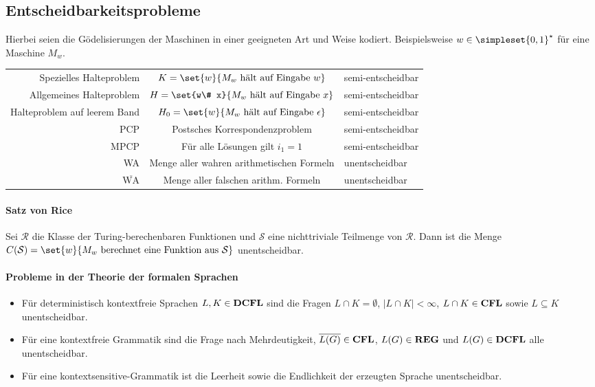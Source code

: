 \subsection{Entscheidbarkeitsprobleme}
Hierbei seien die Gödelisierungen der Maschinen in einer geeigneten Art und Weise kodiert. Beispielsweise $w\in\simpleset{0,1}^\star$ für eine Maschine $M_w$.
\medskip

\begin{tabular}{r|c|l}
	Spezielles Halteproblem & $K=\set{w}{M_w \text{ hält auf Eingabe } w}$ & semi-entscheidbar\\
	Allgemeines Halteproblem & $H=\set{w\# x}{M_w \text{ hält auf Eingabe } x}$ & semi-entscheidbar\\
	Halteproblem auf leerem Band & $H_0=\set{w}{M_w \text{ hält auf Eingabe } \epsilon}$ & semi-entscheidbar\\
	PCP & Postsches Korrespondenzproblem & semi-entscheidbar\\
	MPCP & Für alle Lösungen gilt $i_1=1$ & semi-entscheidbar\\
	WA & Menge aller wahren arithmetischen Formeln & unentscheidbar\\
	$\overline{\text{WA}}$ & Menge aller falschen arithm. Formeln & unentscheidbar
\end{tabular}

\paragraph{Satz von Rice}
Sei $\mathcal R$ die Klasse der Turing-berechenbaren Funktionen und $\mathcal S$ eine nichttriviale Teilmenge von $\mathcal R$.
Dann ist die Menge $C(\mathcal S)=\set{w}{M_w \text{ berechnet eine Funktion aus } \mathcal S}$ unentscheidbar.

\paragraph{Probleme in der Theorie der formalen Sprachen}
\begin{itemize}
	\item Für deterministisch kontextfreie Sprachen $L,K\in\operatorname{\mathbf{DCFL}}$ sind die Fragen $L\cap K=\emptyset$, $|L\cap K|<\infty$, $L\cap K \in \operatorname{\mathbf{CFL}}$ sowie $L\subseteq K$ unentscheidbar.
	\item Für eine kontextfreie Grammatik sind die Frage nach Mehrdeutigkeit, $\overline{L(G)}\in\operatorname{\mathbf{CFL}}$, $L(G)\in \operatorname{\mathbf{REG}}$ und $L(G)\in \operatorname{\mathbf{DCFL}}$ alle unentscheidbar.
	\item Für eine kontextsensitive-Grammatik ist die Leerheit sowie die Endlichkeit der erzeugten Sprache unentscheidbar.
\end{itemize}

